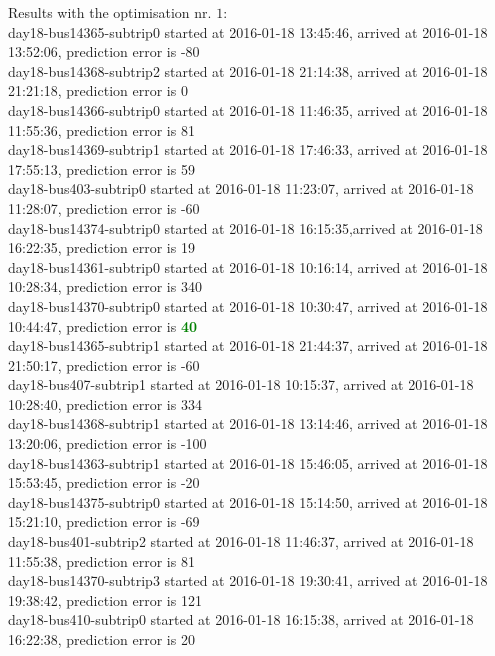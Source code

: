 \documentclass[12pt,a4paper,oneside,openright]{report}
\begin{document}
Results with the optimisation nr. $1$: \\
{\footnotesize
day18-bus14365-subtrip0 started at 2016-01-18 13:45:46, arrived at 2016-01-18 13:52:06, prediction error is -80 \\
day18-bus14368-subtrip2 started at 2016-01-18 21:14:38, arrived at 2016-01-18 21:21:18, prediction error is 0 \\
day18-bus14366-subtrip0 started at 2016-01-18 11:46:35, arrived at 2016-01-18 11:55:36, prediction error is 81 \\
day18-bus14369-subtrip1 started at 2016-01-18 17:46:33, arrived at 2016-01-18 17:55:13, prediction error is 59 \\
day18-bus403-subtrip0 started at 2016-01-18 11:23:07,    arrived at 2016-01-18 11:28:07, prediction error is -60 \\
day18-bus14374-subtrip0 started at 2016-01-18 16:15:35,arrived at 2016-01-18 16:22:35, prediction error is 19 \\
day18-bus14361-subtrip0 started at 2016-01-18 10:16:14, arrived at 2016-01-18 10:28:34, prediction error is 340 \\
day18-bus14370-subtrip0 started at 2016-01-18 10:30:47, arrived at 2016-01-18 10:44:47, prediction error is \textcolor{green}{\textbf{40}} \\
day18-bus14365-subtrip1 started at 2016-01-18 21:44:37, arrived at 2016-01-18 21:50:17, prediction error is -60 \\
day18-bus407-subtrip1 started at 2016-01-18 10:15:37,    arrived at 2016-01-18 10:28:40, prediction error is 334 \\
day18-bus14368-subtrip1 started at 2016-01-18 13:14:46, arrived at 2016-01-18 13:20:06, prediction error is -100 \\
day18-bus14363-subtrip1 started at 2016-01-18 15:46:05, arrived at 2016-01-18 15:53:45, prediction error is -20 \\
day18-bus14375-subtrip0 started at 2016-01-18 15:14:50, arrived at 2016-01-18 15:21:10, prediction error is -69 \\
day18-bus401-subtrip2 started at 2016-01-18 11:46:37,    arrived at 2016-01-18 11:55:38, prediction error is 81 \\
day18-bus14370-subtrip3 started at 2016-01-18 19:30:41, arrived at 2016-01-18 19:38:42, prediction error is 121 \\
day18-bus410-subtrip0 started at 2016-01-18 16:15:38,    arrived at 2016-01-18 16:22:38, prediction error is 20 \\
}
\end{document}
